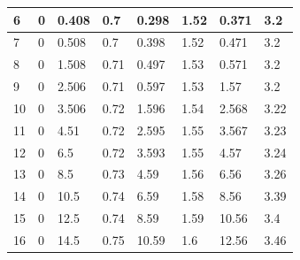 \documentclass[10pt, a4j, dvipdfmx]{jarticle}
\begin{document}
\begin{table}[H]
\begin{tabular}{|l|l|l|l|l|l|l|l|}
            6                         & 0              & 0.408                     & 0.7            & 0.298                     & 1.52            & 0.371                     & 3.2             \\ \hline
            7                         & 0              & 0.508                     & 0.7            & 0.398                     & 1.52            & 0.471                     & 3.2             \\ \hline
            8                         & 0              & 1.508                     & 0.71           & 0.497                     & 1.53            & 0.571                     & 3.2             \\ \hline
            9                         & 0              & 2.506                     & 0.71           & 0.597                     & 1.53            & 1.57                      & 3.2             \\ \hline
            10                        & 0              & 3.506                     & 0.72           & 1.596                     & 1.54            & 2.568                     & 3.22            \\ \hline
            11                        & 0              & 4.51                      & 0.72           & 2.595                     & 1.55            & 3.567                     & 3.23            \\ \hline
            12                        & 0              & 6.5                       & 0.72           & 3.593                     & 1.55            & 4.57                      & 3.24            \\ \hline
            13                        & 0              & 8.5                       & 0.73           & 4.59                      & 1.56            & 6.56                      & 3.26            \\ \hline
            14                        & 0              & 10.5                      & 0.74           & 6.59                      & 1.58            & 8.56                      & 3.39            \\ \hline
            15                        & 0              & 12.5                      & 0.74           & 8.59                      & 1.59            & 10.56                     & 3.4             \\ \hline
            16                        & 0              & 14.5                      & 0.75           & 10.59                     & 1.6             & 12.56                     & 3.46            \\ \hline

\end{tabular}
\end{table}
\end{document}
